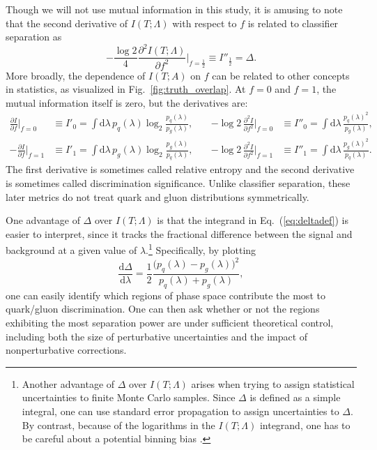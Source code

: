 \documentclass[11pt,letterpaper]{article}
\newcommand{\df}{\text{d}}
\DeclareRobustCommand{\Fig}[1]{Fig.~\ref{#1}}
\DeclareRobustCommand{\Eq}[1]{Eq.~(\ref{#1})}
\begin{document}
Though we will not use mutual information in this study, it is amusing to note that the second derivative of $I(T;\Lambda)$ with respect to $f$ is related to classifier separation as
\begin{equation}
\label{eq:altdeltadef}
- \frac{\log 2}{4} \frac{\partial^2 I(T;\Lambda)}{\partial f^2} \Big|_{f = \frac{1}{2}}  \equiv I''_\frac{1}{2} = \Delta.
\end{equation}
More broadly, the dependence of $I(T;A)$ on $f$ can be related to other concepts in statistics, as visualized in \Fig{fig:truth_overlap}.  At $f = 0$ and $f = 1$, the mutual information itself is zero, but the derivatives are:
\begin{align}
\frac{\partial I}{\partial f} \Big|_{f = 0} &\equiv I'_0 = \int \df \lambda \, p_q(\lambda)  \log_2 \frac{p_q(\lambda)}{p_g(\lambda)}, \quad &- \log 2 \,  \frac{\partial^2 I}{\partial f^2} \Big|_{f = 0} &\equiv I''_0 = \int \df \lambda \,  \frac{p_q(\lambda)^2}{p_g(\lambda)},\\
- \frac{\partial I}{\partial f} \Big|_{f = 1} &\equiv I'_1 = \int \df \lambda \, p_g(\lambda) \log_2 \frac{p_g(\lambda)}{p_q(\lambda)}, \quad &- \log 2 \, \frac{\partial^2 I}{\partial f^2} \Big|_{f = 1} &\equiv I''_1 = \int \df \lambda \, \frac{p_g(\lambda)^2}{p_q(\lambda)}.
\end{align}
The first derivative is sometimes called relative entropy and the second derivative is sometimes called discrimination significance.  Unlike classifier separation, these later  metrics do not treat quark and gluon distributions symmetrically.

One advantage of $\Delta$ over $I(T;\Lambda)$ is that the integrand in \Eq{eq:deltadef} is easier to interpret, since it tracks the fractional difference between the signal and background at a given value of $\lambda$.\footnote{Another advantage of $\Delta$ over $I(T; \Lambda)$ arises when trying to assign statistical uncertainties to finite Monte Carlo samples.  Since $\Delta$ is defined as a simple integral, one can use standard error propagation to assign uncertainties to $\Delta$.  By contrast, because of the logarithms in the $I(T; \Lambda)$ integrand, one has to be careful about a potential binning bias \cite{Larkoski:2014pca}.}  Specifically, by plotting 
\begin{equation}
\label{eq:deltaintegrand}
\frac{\text{d} \Delta}{\text{d} \lambda} = \frac{1}{2} \frac{\bigl(p_q(\lambda) - p_g(\lambda) \bigr)^2}{p_q(\lambda) + p_g(\lambda)},
\end{equation}
one can easily identify which regions of phase space contribute the most to quark/gluon discrimination.  One can then ask whether or not the regions exhibiting the most separation power are under sufficient theoretical control, including both the size of perturbative uncertainties and the impact of nonperturbative corrections.  
\end{document}
